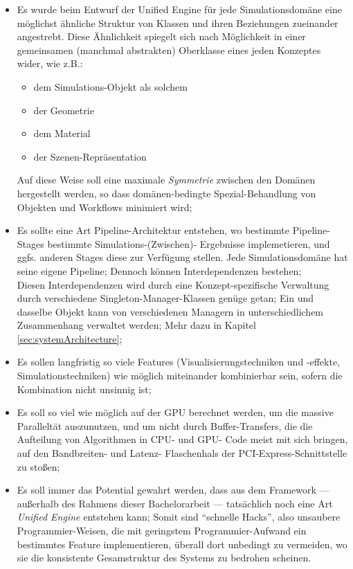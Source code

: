 \begin{itemize}
	\item Es wurde beim Entwurf der Unified Engine für jede Simulationsdomäne eine möglichst ähnliche Struktur von Klassen 	
	und ihren Beziehungen zueinander angestrebt. Diese Ähnlichkeit spiegelt sich nach Möglichkeit in einer gemeinsamen 	
	(manchmal abstrakten) Oberklasse eines jeden Konzeptes wider, wie z.B.:
	\begin{itemize}
		\item dem Simulations-Objekt als solchem
		\item der Geometrie
		\item dem Material
		\item der Szenen-Repräsentation
	\end{itemize}
	Auf diese Weise soll eine maximale \emph{Symmetrie} zwischen den Domänen hergestellt werden, so dass domänen-bedingte 
	Spezial-Behandlung von Objekten und Workflows minimiert wird;

	\item Es sollte eine Art Pipeline-Architektur entstehen, wo bestimmte Pipeline-Stages bestimmte Simulations-(Zwischen)-
	Ergebnisse implemetieren, und ggfs. anderen Stages diese zur Verfügung stellen. Jede Simulationsdomäne hat seine eigene 
	Pipeline; Dennoch können Interdependenzen bestehen;\\
	Diesen Interdependenzen wird durch eine Konzept-spezifische Verwaltung durch verschiedene Singleton-Manager-Klassen 	
	genüge getan; Ein und dasselbe Objekt kann von verschiedenen Managern in unterschiedlichem Zusammenhang verwaltet 
	werden; Mehr dazu in Kapitel \ref{sec:systemArchitecture};

	\item Es sollen langfristig so viele Features (Visualisierungstechniken und -effekte, Simulationstechniken) wie möglich 
	miteinander kombinierbar sein, sofern die Kombination nicht unsinnig ist;

	\item Es soll so viel wie möglich auf der GPU berechnet werden, um die massive Paralleltät auszunutzen, 
	und um nicht durch Buffer-Transfers, die die Aufteilung von Algorithmen in CPU- und GPU- Code meist mit sich bringen, 	
	auf den Bandbreiten- und Latenz- Flaschenhals der PCI-Express-Schnittstelle zu stoßen;
	
	\item Es soll immer das Potential gewahrt werden, dass aus dem Framework --- außerhalb des Rahmens dieser 
	Bachelorarbeit --- tatsächlich noch eine Art \emph{Unified Engine} entstehen kann; Somit sind "`schnelle Hacks"',
	also unsaubere Programmier-Weisen, die mit geringstem Programmier-Aufwand ein bestimmtes Feature implementieren,
	überall dort unbedingt zu vermeiden, wo sie die konsistente Gesamstruktur des Systems zu bedrohen scheinen.

\end{itemize}




